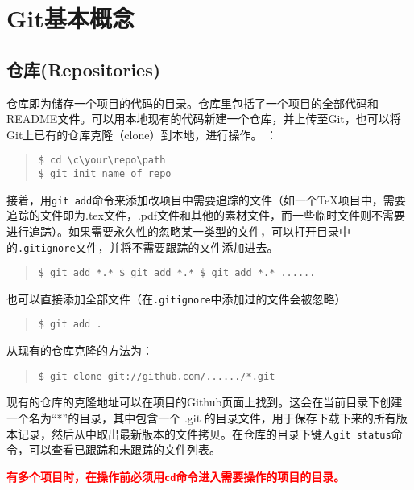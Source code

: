 \documentclass{article}
\begin{document}
	\section{Git基本概念} %
	\label{sec:git基本概念}
		\subsection{仓库(Repositories)}
			仓库即为储存一个项目的代码的目录。仓库里包括了一个项目的全部代码和README文件。可以用本地现有的代码新建一个仓库，并上传至Git，也可以将Git上已有的仓库克隆（clone）到本地，进行操作。
			：
				\begin{quote}
					\begin{lstlisting}
$ cd \c\your\repo\path
$ git init name_of_repo
					\end{lstlisting}
				\end{quote}
			\par 接着，用{\tt git add}命令来添加改项目中需要追踪的文件（如一个TeX项目中，需要追踪的文件即为.tex文件，.pdf文件和其他的素材文件，而一些临时文件则不需要进行追踪）。如果需要永久性的忽略某一类型的文件，可以打开目录中的{\tt .gitignore}文件，并将不需要跟踪的文件添加进去。
			\begin{quote}
				\begin{lstlisting}
$ git add *.* $ git add *.* $ git add *.* ......
				\end{lstlisting}
			\end{quote}
			也可以直接添加全部文件（在{\tt .gitignore}中添加过的文件会被忽略）
			\begin{quote}
				\begin{lstlisting}
$ git add .
				\end{lstlisting}
			\end{quote}
			\par 从现有的仓库克隆的方法为：
			\begin{quote}
				\begin{lstlisting}
$ git clone git://github.com/....../*.git
				\end{lstlisting}
			\end{quote}
			\par 现有的仓库的克隆地址可以在项目的Github页面上找到。这会在当前目录下创建一个名为“*”的目录，其中包含一个 .git 的目录文件，用于保存下载下来的所有版本记录，然后从中取出最新版本的文件拷贝。在仓库的目录下键入{\tt git status}命令，可以查看已跟踪和未跟踪的文件列表。
			\par{\bf\textcolor{red}{有多个项目时，在操作前必须用{\tt cd}命令进入需要操作的项目的目录。}}
\end{document}
